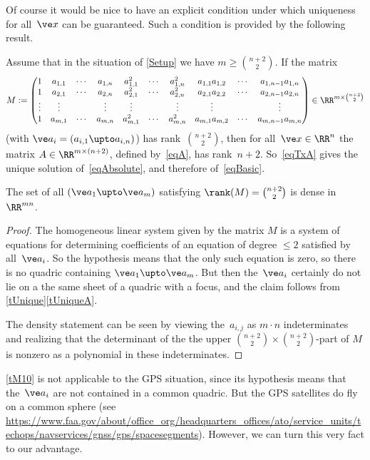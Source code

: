 \documentclass[reqno]{amsart}
\begin{document}
Of course it would be nice to have an explicit condition under which
uniqueness for all~$\ve x$ can be guaranteed. Such a condition is
provided by the following result.

\begin{theorem} \label{tM10}%
  Assume that in the situation of \cref{Setup} we have
  $m \ge \binom{n+2}{2}$. If the matrix
  \[
    M := \begin{pmatrix}
      1 & a_{1,1} & \cdots & a_{1,n} & a_{1,1}^2 & \cdots &
      a_{1,n}^2 & a_{1,1} a_{1,2} & \cdots & a_{1,n-1} a_{1,n} \\
      1 & a_{2,1} & \cdots & a_{2,n} & a_{2,1}^2 & \cdots &
      a_{2,n}^2 & a_{2,1} a_{2,2} & \cdots & a_{2,n-1} a_{2,n} \\
      \vdots & \vdots & & \vdots & \vdots & & \vdots & \vdots & &
      \vdots \\
      1 & a_{m,1} & \cdots & a_{m,n} & a_{m,1}^2 & \cdots &
      a_{m,n}^2 & a_{m,1} a_{m,2} & \cdots & a_{m,n-1} a_{m,n}
    \end{pmatrix} \in \RR^{m \times \binom{n+2}{2}}
  \]
  (with $\ve a_i = (a_{i,1} \upto a_{i,n})$) has
  rank~$\binom{n+2}{2}$, then for all~$\ve x \in \RR^n$ the matrix
  $A \in \RR^{m \times (n + 2)}$, defined by~\eqref{eqA}, has
  rank~$n + 2$. So~\eqref{eqTxA} gives the unique solution
  of~\eqref{eqAbsolute}, and therefore of~\eqref{eqBasic}.

  The set of all $(\ve a_1 \upto \ve a_m)$ satisfying
  $\rank(M) = \binom{n+2}{2}$ is dense in $\RR^{m n}$.
\end{theorem}

\begin{proof}
  The homogeneous linear system given by the matrix $M$ is a system of
  equations for determining coefficients of an equation of degree
  $\le 2$ satisfied by all~$\ve a_i$. So the hypothesis means that the
  only such equation is zero, so there is no quadric containing
  $\ve a_1 \upto \ve a_m$. But then the~$\ve a_i$ certainly do not lie
  on a the same sheet of a quadric with a focus, and the claim follows
  from \cref{tUnique}\ref{tUniqueA}.

  The density statement can be seen by viewing the~$a_{i,j}$ as
  $m \cdot n$ indeterminates and realizing that the determinant of the
  the upper $\binom{n+2}{2} \times \binom{n+2}{2}$-part of $M$ is
  nonzero as a polynomial in these indeterminates.
\end{proof}

\cref{tM10} is not applicable to the GPS situation, since its
hypothesis means that the~$\ve a_i$ are not contained in a common
quadric. But the GPS satellites do fly on a common sphere (see
\url{https://www.faa.gov/about/office_org/headquarters_offices/ato/service_units/techops/navservices/gnss/gps/spacesegments}). However,
we can turn this very fact to our advantage.
\end{document}
